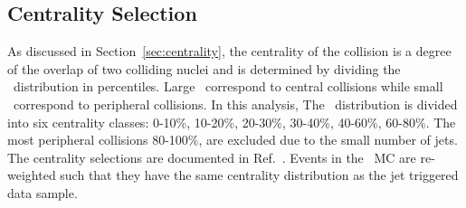 \subsection{Centrality Selection}
\label{sec:cent}
As discussed in Section~\ref{sec:centrality}, the centrality of the collision is a degree of the overlap of two colliding nuclei and is determined by dividing the \ETfcal\ distribution in percentiles.
Large \ETfcal\ correspond to central collisions while small \ETfcal\ correspond to peripheral collisions. 
In this analysis, The \ETfcal\ distribution is divided into six centrality classes: 0-10\%, 10-20\%, 20-30\%, 30-40\%, 40-60\%, 60-80\%.
The most peripheral collisions 80-100\%, are excluded due to  the small number of jets.
The centrality selections are documented in Ref.~\cite{Perepelitsa:2212936}.
Events in the \PbPb\ MC are re-weighted such that they have the same centrality distribution as the jet triggered data sample.
